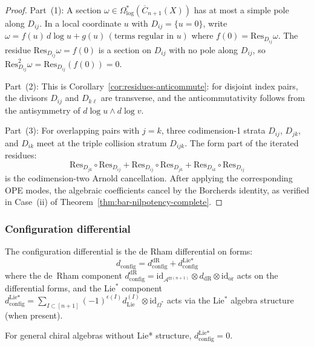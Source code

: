  \begin{proof}
 Part~(1): A section $\omega \in \Omega^*_{\log}(\overline{C}_{n+1}(X))$ has at most a simple pole along $D_{ij}$. In a local coordinate $u$ with $D_{ij} = \{u = 0\}$, write
 $\omega = f(u)\,d\log u + g(u)\,(\text{terms regular in }u)$
 where $f(0) = \mathrm{Res}_{D_{ij}}\omega$. The residue $\mathrm{Res}_{D_{ij}}\omega = f(0)$ is a section on $D_{ij}$ with no pole along $D_{ij}$, so $\mathrm{Res}_{D_{ij}}^2\omega = \mathrm{Res}_{D_{ij}}(f(0)) = 0$.

 Part~(2): This is Corollary~\ref{cor:residues-anticommute}: for disjoint index pairs, the divisors $D_{ij}$ and $D_{k\ell}$ are transverse, and the anticommutativity follows from the antisymmetry of $d\log u \wedge d\log v$.

 Part~(3): For overlapping pairs with $j = k$, three codimension-1 strata $D_{ij}$, $D_{jk}$, and $D_{ik}$ meet at the triple collision stratum $D_{ijk}$. The form part of the iterated residues:
 \[
 \mathrm{Res}_{D_{jk}} \circ \mathrm{Res}_{D_{ij}} + \mathrm{Res}_{D_{ij}} \circ \mathrm{Res}_{D_{jk}} + \mathrm{Res}_{D_{ik}} \circ \mathrm{Res}_{D_{ij}}
 \]
 is the codimension-two Arnold cancellation. After applying the
 corresponding OPE modes, the algebraic coefficients cancel by the
 Borcherds identity, as verified in Case~(ii) of
 Theorem~\ref{thm:bar-nilpotency-complete}.
 \end{proof}


\subsubsection{Configuration differential}

\begin{definition}
 The configuration differential is the de Rham differential on forms:
 \[d_{\text{config}} = d_{\text{config}}^{\text{dR}} + d_{\text{config}}^{\text{Lie*}}\]
 where the de~Rham component $d_{\text{config}}^{\text{dR}} = \text{id}_{\mathcal{A}^{\boxtimes(n+1)}} \otimes d_{\text{dR}} \otimes \text{id}_{\text{or}}$ acts on the differential forms, and the Lie$^*$ component $d_{\text{config}}^{\text{Lie*}} = \sum_{I \subset [n+1]} (-1)^{\epsilon(I)} d_{\text{Lie}}^{(I)} \otimes \text{id}_{\Omega^*}$ acts via the Lie$^*$ algebra structure (when present).

 For general chiral algebras without Lie* structure, $d_{\text{config}}^{\text{Lie*}} = 0$.
 \end{definition}

